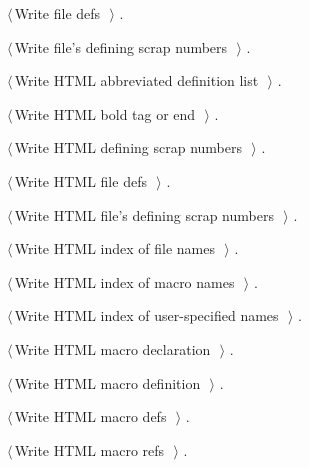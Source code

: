 \documentclass[a4paper]{report}
\begin{document}
{\begin{list}{}{\setlength{\itemsep}{-\parsep}\setlength{\itemindent}{-\leftmargin}}
\item $\langle\,$Write file defs\nobreak\ {\footnotesize {}}$\,\rangle$ {\footnotesize {\NWtxtRefIn} .}
\item $\langle\,$Write file's defining scrap numbers\nobreak\ {\footnotesize {}}$\,\rangle$ {\footnotesize {\NWtxtRefIn} .}
\item $\langle\,$Write HTML abbreviated definition list\nobreak\ {\footnotesize {}}$\,\rangle$ {\footnotesize {\NWtxtRefIn} .}
\item $\langle\,$Write HTML bold tag or end\nobreak\ {\footnotesize {}}$\,\rangle$ {\footnotesize {\NWtxtRefIn} .}
\item $\langle\,$Write HTML defining scrap numbers\nobreak\ {\footnotesize {}}$\,\rangle$ {\footnotesize {\NWtxtRefIn} .}
\item $\langle\,$Write HTML file defs\nobreak\ {\footnotesize {}}$\,\rangle$ {\footnotesize {\NWtxtRefIn} .}
\item $\langle\,$Write HTML file's defining scrap numbers\nobreak\ {\footnotesize {}}$\,\rangle$ {\footnotesize {\NWtxtRefIn} .}
\item $\langle\,$Write HTML index of file names\nobreak\ {\footnotesize {}}$\,\rangle$ {\footnotesize {\NWtxtRefIn} .}
\item $\langle\,$Write HTML index of macro names\nobreak\ {\footnotesize {}}$\,\rangle$ {\footnotesize {\NWtxtRefIn} .}
\item $\langle\,$Write HTML index of user-specified names\nobreak\ {\footnotesize {}}$\,\rangle$ {\footnotesize {\NWtxtRefIn} .}
\item $\langle\,$Write HTML macro declaration\nobreak\ {\footnotesize {}}$\,\rangle$ {\footnotesize {\NWtxtRefIn} .}
\item $\langle\,$Write HTML macro definition\nobreak\ {\footnotesize {}}$\,\rangle$ {\footnotesize {\NWtxtRefIn} .}
\item $\langle\,$Write HTML macro defs\nobreak\ {\footnotesize {}}$\,\rangle$ {\footnotesize {\NWtxtRefIn} .}
\item $\langle\,$Write HTML macro refs\nobreak\ {\footnotesize {}}$\,\rangle$ {\footnotesize {\NWtxtRefIn} .}

\end{list}}
\end{document}
